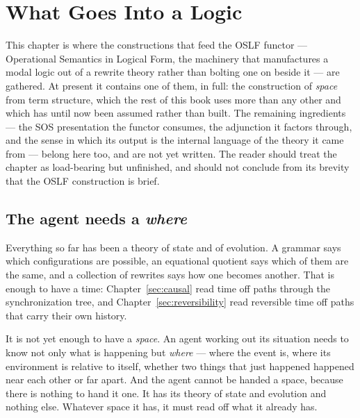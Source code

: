 \chapter{What Goes Into a Logic}
\label{sec:oslf-inputs}

\begin{remark}
\label{rmk:oslf-status}
This chapter is where the constructions that feed the OSLF
functor --- Operational Semantics in Logical Form, the machinery
that manufactures a modal logic out of a rewrite theory rather
than bolting one on beside it --- are gathered.
At present it contains one of them, in full: the construction of
\emph{space} from term structure, which the rest of this book uses
more than any other and which has until now been assumed rather
than built.
The remaining ingredients --- the SOS presentation the functor
consumes, the adjunction it factors through, and the sense in
which its output is the internal language of the theory it came
from --- belong here too, and are not yet written.
The reader should treat the chapter as load-bearing but
unfinished, and should not conclude from its brevity that the
OSLF construction is brief.
\end{remark}

\section{The agent needs a \emph{where}}

Everything so far has been a theory of state and of evolution.
A grammar says which configurations are possible, an equational
quotient says which of them are the same, and a collection of
rewrites says how one becomes another.
That is enough to have a time: Chapter~\ref{sec:causal} read time
off paths through the synchronization tree, and
Chapter~\ref{sec:reversibility} read reversible time off paths
that carry their own history.

It is not yet enough to have a \emph{space}.
An agent working out its situation needs to know not only what is
happening but \emph{where} --- where the event is, where its
environment is relative to itself, whether two things that just
happened happened near each other or far apart.
And the agent cannot be handed a space, because there is nothing
to hand it one.
It has its theory of state and evolution and nothing else.
Whatever space it has, it must read off what it already has.

